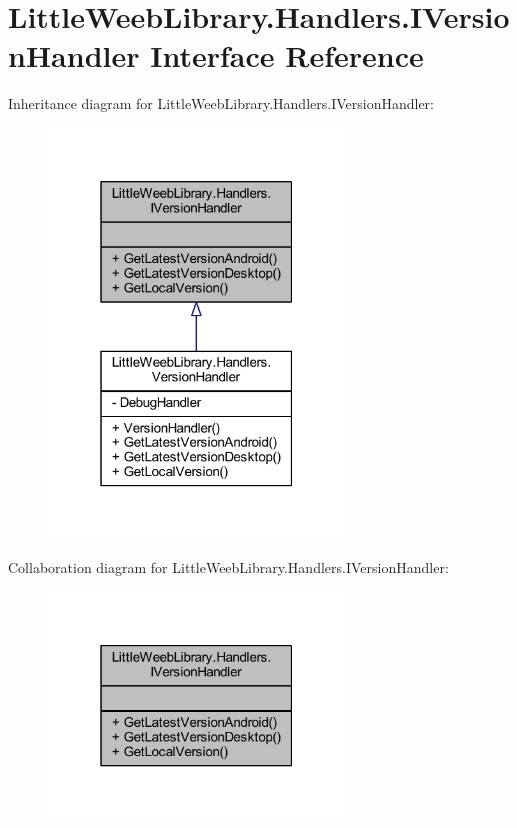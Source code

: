 \hypertarget{interface_little_weeb_library_1_1_handlers_1_1_i_version_handler}{}\section{Little\+Weeb\+Library.\+Handlers.\+I\+Version\+Handler Interface Reference}
\label{interface_little_weeb_library_1_1_handlers_1_1_i_version_handler}


Inheritance diagram for Little\+Weeb\+Library.\+Handlers.\+I\+Version\+Handler\+:\nopagebreak
\begin{figure}[H]
\begin{center}
\leavevmode
\includegraphics[width=223pt]{interface_little_weeb_library_1_1_handlers_1_1_i_version_handler__inherit__graph}
\end{center}
\end{figure}


Collaboration diagram for Little\+Weeb\+Library.\+Handlers.\+I\+Version\+Handler\+:\nopagebreak
\begin{figure}[H]
\begin{center}
\leavevmode
\includegraphics[width=223pt]{interface_little_weeb_library_1_1_handlers_1_1_i_version_handler__coll__graph}
\end{center}
\end{figure}
